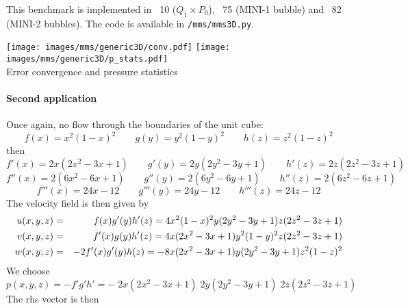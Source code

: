 This benchmark is implemented in \stone~{10} ($Q_1\times P_0$), 
\stone~{75} (MINI-1 bubble) 
and \stone~{82} (MINI-2 bubbles).  
The code is available in {\tt /mms/mms3D.py}.

\begin{center}
\texttt{[image: images/mms/generic3D/conv.pdf]}
\texttt{[image: images/mms/generic3D/p\_stats.pdf]}\\
{\captionfont Error convergence and pressure statistics}
\end{center}

\newpage
\paragraph{Second application}

Once again, no flow through the boundaries of the unit cube:
\[
f(x)=x^2(1-x)^2 \qquad
g(y)=y^2(1-y)^2 \qquad
h(z)=z^2(1-z)^2 
\]
then 
\[
f'(x)=2x(2x^2-3x+1) \qquad
g'(y)=2y(2y^2-3y+1) \qquad
h'(z)=2z(2z^2-3z+1) 
\]
\[
f''(x)=2(6x^2-6x+1) \qquad
g''(y)=2(6y^2-6y+1) \qquad
h''(z)=2(6z^2-6z+1)
\]
\[
f'''(x)=24x-12 \qquad
g'''(y)=24y-12 \qquad
h'''(z)=24z-12
\]
The velocity field is then given by
\begin{eqnarray}
u(x,y,z) 
&=& f(x) g'(y) h'(z) 
= 4 x^2(1-x)^2  y(2y^2-3y+1) z(2z^2-3z+1)  \nonumber\\
v(x,y,z) 
&=& f'(x) g(y) h'(z) 
= 4 x(2x^2-3x+1) y^2(1-y)^2 z(2z^2-3z+1) \nonumber\\
w(x,y,z) 
&=& -2f'(x) g'(y) h(z) 
= -8 x(2x^2-3x+1) y(2y^2-3y+1) z^2(1-z)^2 
\end{eqnarray}
We choose
\[
p(x,y,z)=-f'g'h' = - \; 2x(2x^2-3x+1) \;  2y(2y^2-3y+1) \;  2z(2z^2-3z+1) 
\]
The rhs vector is then
